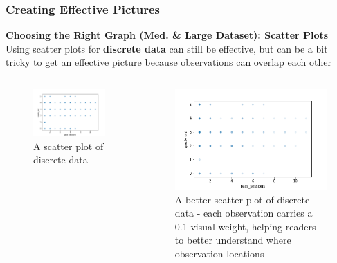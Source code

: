 \documentclass{beamer}
\begin{document}
\begin{frame}
\frametitle{Creating Effective Pictures}
\textbf{Choosing the Right Graph (Med. \& Large Dataset): Scatter Plots}\\
\vspace{0.5cm}
Using scatter plots for \textbf{discrete data} can still be effective, but can be a bit tricky to get an effective picture because observations can overlap each other
\vspace{-1cm}
\begin{columns}[t]
\begin{figure}
\includegraphics[scale=0.3]{scatter_1}
\caption{A scatter plot of discrete data}
\end{figure}
\begin{figure}
\includegraphics[scale=0.3]{scatter_2}
\caption{A better scatter plot of discrete data - each observation carries a 0.1 visual weight, helping readers to better understand where observation locations}
\end{figure}
\end{columns}
\end{frame}
\end{document}
